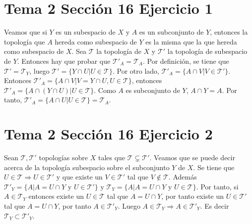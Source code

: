 \documentclass{article}
\begin{document}
\section{Tema 2 Sección 16 Ejercicio 1}
Veamos que si $Y$ es un subespacio de $X$ y $A$ es un subconjunto de $Y$, entonces la topología que $A$ hereda como subespacio de $Y$ es la misma que la que hereda como subespacio de $X$. Sea $\mathcal{T}$ la topología de $X$ y $\mathcal{T}'$ la topología de subespacio de $Y$. Entonces hay que probar que  $\mathcal{T}'_A=\mathcal{T}_A$. Por definición, se tiene que $\mathcal{T}'=\mathcal{T}_Y$, luego $\mathcal{T}'=\{Y\cap U| U\in \mathcal{T}\}$. Por otro lado, $\mathcal{T}'_A=\{A\cap V| V\in \mathcal{T}'\}$. Entonces $\mathcal{T}'_A=\{A\cap V| V=Y\cap U, U\in \mathcal{T}\}$, entonces  
$\mathcal{T}'_A=\{A\cap (Y\cap U)|  U\in \mathcal{T}\}$. Como $A$ es subconjunto de $Y$, $A\cap Y=A$. Por tanto, $\mathcal{T}'_A=\{A\cap U|  U\in \mathcal{T}\}=\mathcal{T}_A$.

\section{Tema 2 Sección 16 Ejercicio 2}
Sean $\mathcal{T},\mathcal{T}'$ topologías sobre $X$ tales que $\mathcal{T}\subsetneq\mathcal{T}'$. Veamos que se puede decir acerca de la topología subespacio sobre el subconjunto $Y$ de $X$. Se tiene que $U\in\mathcal{T}\Rightarrow U\in\mathcal{T}'$ y que existe un $V\in \mathcal{T}'$ tal que $V\notin \mathcal{T}$. Además $\mathcal{T}'_Y=\{A|A=U\cap Y\text{ y }U\in \mathcal{T}'\}$ y $\mathcal{T}_Y=\{A|A=U\cap Y\text{ y }U\in \mathcal{T}\}$. Por tanto, si $A\in\mathcal{T}_Y$ entonces existe un $U\in\mathcal{T}$ tal que $A=U\cap Y$, por tanto existe un $U\in\mathcal{T}'$ tal que $A=U\cap Y$, por tanto $A\in\mathcal{T}'_Y$. Luego $A\in\mathcal{T}_Y\Rightarrow A\in\mathcal{T}'_Y$. Es decir $\mathcal{T}_Y\subset\mathcal{T}'_Y$.
\end{document}
